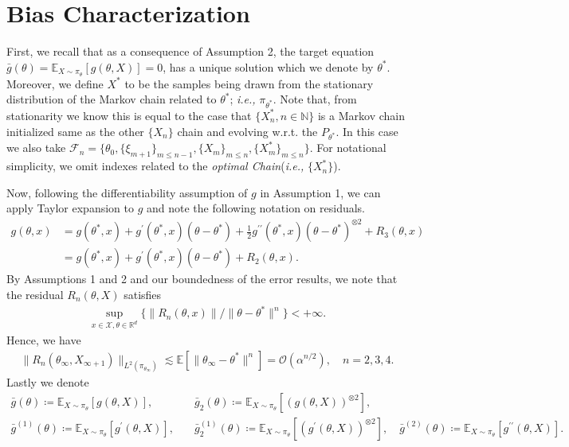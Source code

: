 \documentclass[a4paper]{article}
\newcommand{\norm}[1]{\|#1 \|}
\newcommand{\Exs}{\mathbb{E}}
\newcommand{\thetastar}{\theta^*}
\newcommand{\thetainf}{\theta_\infty}
\newcommand{\xstar}{X^*}
\newcommand{\xinfPone}{X_{\infty + 1}}
\newcommand{\stepsize}{\alpha}
\begin{document}
	\section{Bias Characterization}
	First, we recall that as a consequence of Assumption 2, the target equation $\bar{g}\left(\theta\right) = \Exs_{X \sim \pi_{\theta}}\left[g\left(\theta, X\right)\right] = 0$, has a unique solution which we denote by $\thetastar$. Moreover, we define $\xstar$ to be the samples being drawn from the stationary distribution of the Markov chain related to $\thetastar$; \textit{i.e.,} $\pi_{\thetastar}$. Note that, from stationarity we know this is equal to the case that $\{X^{*}_{n}, n \in \mathbb{N}\}$ is a Markov chain initialized same as the other $\{X_{n}\}$ chain and evolving w.r.t. the $P_{\thetastar}$. In this case we also take $\mathcal{F}_{n} = \{\theta_{0}, \{\xi_{m + 1}\}_{m \leq n - 1}, \{X_{m}\}_{m \leq n}, \{X^{*}_{m}\}_{m \leq n} \}$. For notational simplicity, we omit indexes related to the \textit{optimal Chain}(\textit{i.e.,} $\{X^{*}_{n}\}$).
	
	Now, following the differentiability assumption of $g$ in Assumption 1, we can apply Taylor expansion to $g$ and note the following notation on residuals.
	\begin{align*}
		g(\theta, x) &= g\left(\thetastar, x\right) + g^{\prime}\left(\thetastar, x\right)\left(\theta - \thetastar\right) + \frac{1}{2}g^{\prime\prime}\left(\thetastar, x\right)\left(\theta - \thetastar\right)^{\otimes 2} + R_{3}\left(\theta, x\right)\\
		&= g\left(\thetastar, x\right) + g^{\prime}\left(\thetastar, x\right)\left(\theta - \thetastar\right) + R_{2}\left(\theta, x\right).
	\end{align*}
	By Assumptions 1 and 2 and our boundedness of the error results,  we note that the residual $R_{n}\left(\theta, X\right)$ satisfies
	\begin{align*}
		\sup_{x \in \mathcal{X}, \theta \in \mathbb{R}^{d}}\{\norm{R_{n}\left(\theta, x\right)} / \norm{\theta - \thetastar}^{n}\} < +\infty.
	\end{align*}
	Hence, we have
	\begin{align*}
		\norm{R_{n}\left(\thetainf, \xinfPone\right)}_{L^{2}\left(\pi_{\thetainf}\right)} \lesssim \Exs\left[\norm{\thetainf - \thetastar}^{n}\right] = \mathcal{O}\left(\stepsize^{n / 2}\right), \quad n = 2, 3, 4.
	\end{align*}
	Lastly we denote
	\begin{align*}
		\bar{g}\left(\theta\right) \coloneq \Exs_{X \sim \pi_{\theta}}\left[g\left(\theta, X\right)\right],& \quad \bar{g}_{2}\left(\theta\right) \coloneq \Exs_{X \sim \pi_{\theta}}\left[\left(g\left(\theta, X\right)\right)^{\otimes 2}\right],\\
		\bar{g}^{(1)}\left(\theta\right) \coloneq \Exs_{X \sim \pi_{\theta}}\left[g^{\prime}\left(\theta, X\right)\right],& \quad \bar{g}_{2}^{(1)}\left(\theta\right) \coloneq \Exs_{X \sim \pi_{\theta}}\left[\left(g^{\prime}\left(\theta, X\right)\right)^{\otimes 2}\right], \quad \bar{g}^{(2)}\left(\theta\right) \coloneq \Exs_{X \sim \pi_{\theta}}\left[g^{\prime\prime}\left(\theta, X\right)\right].
	\end{align*}
	
\end{document}
